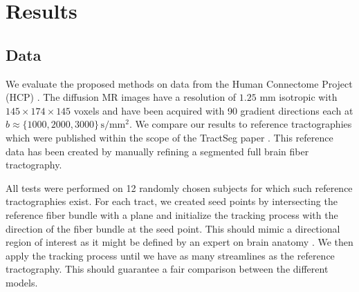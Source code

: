 \section{Results}
\label{sec:results}
\subsection{Data}
\label{sec:data}
We evaluate the proposed methods on data from the Human
Connectome Project (HCP) \cite{HCP}. The diffusion MR images have a resolution of $1.25$ mm
isotropic with $145 \times 174 \times 145$ voxels and have been acquired with 90 gradient directions each at $b\approx\{1000,2000,3000\}\,\mathrm{s}/\mathrm{mm}^2$.
%
We compare our results to reference tractographies which were published within the
scope of the TractSeg paper \cite{WASSERTHAL2018239}. This reference data has been
created by manually refining a segmented full brain fiber tractography. %

All tests were performed on 12 randomly chosen subjects for which such reference tractographies
exist. For each tract, we created seed points by intersecting the reference
fiber bundle with a plane and initialize the tracking process with the direction
of the fiber bundle at the seed point. This should mimic a directional region of
interest as it might be defined by an expert on brain anatomy
\cite{Graumann2016}. We then apply the tracking process until we have as many
streamlines as the reference tractography. This should guarantee a fair comparison between the different models.



